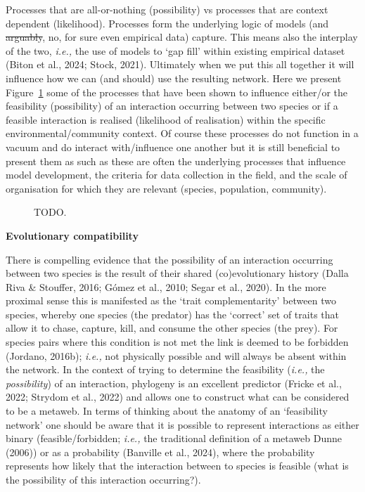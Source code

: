 \documentclass[
]{article}
\begin{document}
Processes that are all-or-nothing (possibility) vs processes that are
context dependent (likelihood). Processes form the underlying logic of
models (and \st{arguably}, no, for sure even empirical data) capture.
This means also the interplay of the two, \emph{i.e.,} the use of models
to `gap fill' within existing empirical dataset (Biton et al., 2024;
Stock, 2021). Ultimately when we put this all together it will influence
how we can (and should) use the resulting network. Here we present
Figure~\ref{fig-feasibility} some of the processes that have been shown
to influence either/or the feasibility (possibility) of an interaction
occurring between two species or if a feasible interaction is realised
(likelihood of realisation) within the specific environmental/community
context. Of course these processes do not function in a vacuum and do
interact with/influence one another but it is still beneficial to
present them as such as these are often the underlying processes that
influence model development, the criteria for data collection in the
field, and the scale of organisation for which they are relevant
(species, population, community).

\begin{figure}


\caption{\label{fig-feasibility}TODO.}

\end{figure}%

\textbf{Evolutionary compatibility}

There is compelling evidence that the possibility of an interaction
occurring between two species is the result of their shared
(co)evolutionary history (Dalla Riva \& Stouffer, 2016; Gómez et al.,
2010; Segar et al., 2020). In the more proximal sense this is manifested
as the `trait complementarity' between two species, whereby one species
(the predator) has the `correct' set of traits that allow it to chase,
capture, kill, and consume the other species (the prey). For species
pairs where this condition is not met the link is deemed to be forbidden
(Jordano, 2016b); \emph{i.e.,} not physically possible and will always
be absent within the network. In the context of trying to determine the
feasibility (\emph{i.e.,} the \emph{possibility}) of an interaction,
phylogeny is an excellent predictor (Fricke et al., 2022; Strydom et
al., 2022) and allows one to construct what can be considered to be a
metaweb. In terms of thinking about the anatomy of an `feasibility
network' one should be aware that it is possible to represent
interactions as either binary (feasible/forbidden; \emph{i.e.,} the
traditional definition of a metaweb Dunne (2006)) or as a probability
(Banville et al., 2024), where the probability represents how likely
that the interaction between to species is feasible (what is the
possibility of this interaction occurring?).
\end{document}
